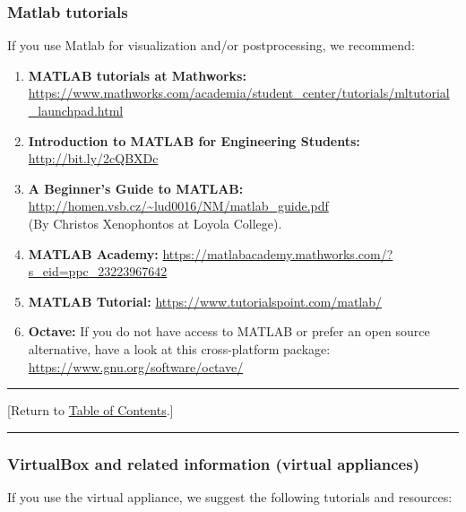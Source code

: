 \documentclass[12pt]{article}
\newcommand{\TOClink}{\begin{center}\hrule\vskip-5pt\phantom{.}\hfill[Return to \hyperlink{TOC}{Table of Contents}.]\hfill\phantom{.}\vskip3pt\hrule\end{center}}
\begin{document}
\subsubsection{Matlab tutorials}
If you use Matlab for visualization and/or postprocessing, we recommend:

\begin{enumerate}

\item 
\textbf{MATLAB tutorials at Mathworks:} \hfill\break
\href{https://www.mathworks.com/academia/student_center/tutorials/mltutorial_launchpad.html}{https://www.mathworks.com/academia/student\_center/tutorials/mltutorial\_launchpad.html}

\item 
\textbf{Introduction to MATLAB for Engineering Students:} \href{https://www.mccormick.northwestern.edu/documents/students/undergraduate/introduction-to-matlab.pdf
}{http://bit.ly/2cQBXDc}

\item 
\textbf{A Beginner's Guide to MATLAB: } 
\href{http://homen.vsb.cz/~lud0016/NM/matlab_guide.pdf}{http://homen.vsb.cz/\~{}lud0016/NM/matlab\_guide.pdf
} \\ 
(By Christos Xenophontos at Loyola College).

\item 
\textbf{MATLAB Academy:} 
\href{https://matlabacademy.mathworks.com/?s_eid=ppc_23223967642}{https://matlabacademy.mathworks.com/?s\_eid=ppc\_23223967642}

\item 
\textbf{MATLAB Tutorial:} 
\href{https://www.tutorialspoint.com/matlab/}{https://www.tutorialspoint.com/matlab/}

\item 
\textbf{Octave:} If you do not have access to MATLAB or prefer an open source 
alternative, have a look at this cross-platform package: \\
\href{https://www.gnu.org/software/octave/}{https://www.gnu.org/software/octave/} 

\end{enumerate}
\TOClink 

\subsubsection{VirtualBox and related information (virtual appliances)}
If you use the virtual appliance, we suggest the following tutorials and resources: 
\end{document}
